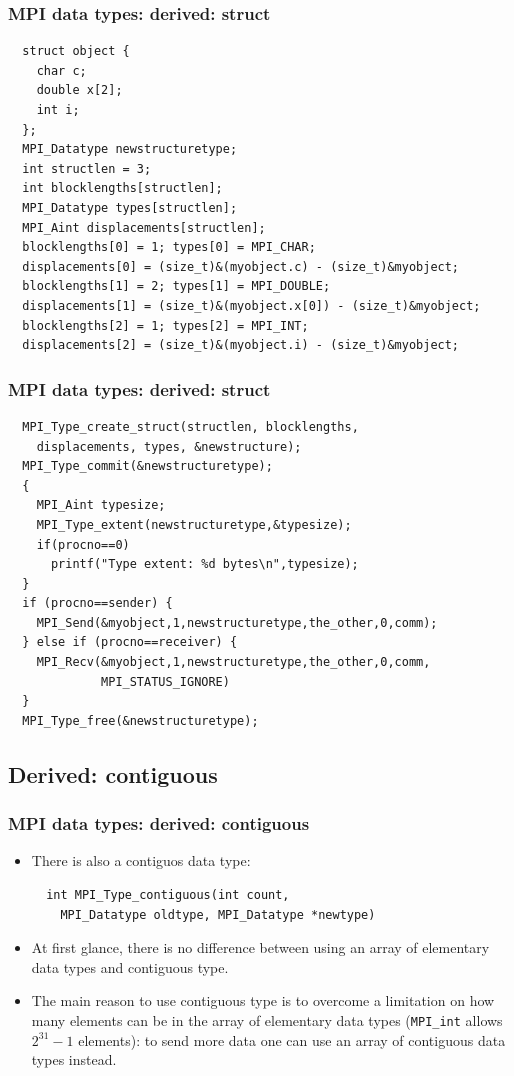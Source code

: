\documentclass{beamer}
\begin{document}
\begin{frame}[fragile]
  \frametitle{MPI data types: derived: struct}
{\color{mycolorcode}
{\small
\begin{verbatim}
  struct object {
    char c;
    double x[2];
    int i;
  };
  MPI_Datatype newstructuretype;
  int structlen = 3;
  int blocklengths[structlen]; 
  MPI_Datatype types[structlen];
  MPI_Aint displacements[structlen];
  blocklengths[0] = 1; types[0] = MPI_CHAR;
  displacements[0] = (size_t)&(myobject.c) - (size_t)&myobject;
  blocklengths[1] = 2; types[1] = MPI_DOUBLE;
  displacements[1] = (size_t)&(myobject.x[0]) - (size_t)&myobject;
  blocklengths[2] = 1; types[2] = MPI_INT;
  displacements[2] = (size_t)&(myobject.i) - (size_t)&myobject;
\end{verbatim}
}
}
\end{frame}

\begin{frame}[fragile]
  \frametitle{MPI data types: derived: struct}
{\color{mycolorcode}
\begin{verbatim}
  MPI_Type_create_struct(structlen, blocklengths, 
    displacements, types, &newstructure);
  MPI_Type_commit(&newstructuretype);
  {
    MPI_Aint typesize;
    MPI_Type_extent(newstructuretype,&typesize);
    if(procno==0) 
      printf("Type extent: %d bytes\n",typesize);
  }
  if (procno==sender) {
    MPI_Send(&myobject,1,newstructuretype,the_other,0,comm);
  } else if (procno==receiver) {
    MPI_Recv(&myobject,1,newstructuretype,the_other,0,comm,
             MPI_STATUS_IGNORE)
  }
  MPI_Type_free(&newstructuretype);
\end{verbatim}
}
\end{frame}

\subsection{Derived: contiguous}
\begin{frame}[fragile]
  \frametitle{MPI data types: derived: contiguous}
\begin{itemize}
\item There is also a contiguos data type:
{\color{mycolorcode}
\begin{verbatim}
  int MPI_Type_contiguous(int count, 
    MPI_Datatype oldtype, MPI_Datatype *newtype)
\end{verbatim}
}
\item At first glance, there is no difference between using an array of elementary data types and contiguous type. 
\item The main reason to use contiguous type is to overcome a limitation on how many elements can be in the array of elementary data types ({\color{mycolorcode}\verb|MPI_int|} allows $2^{31}-1$ elements): 
to send more data one can use an array of contiguous data types instead.
\end{itemize}
\end{frame}
\end{document}
